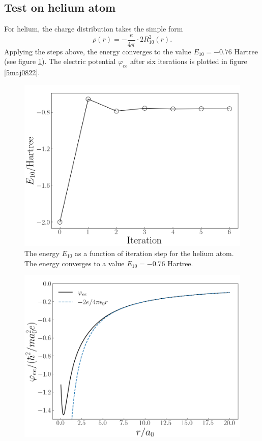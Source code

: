\documentclass[twocolumn]{article}
\begin{document}
\begin{large}
\subsection*{Test on helium atom}
For helium, the charge distribution takes the simple form
\begin{equation}
    \rho(r) = -\frac{e}{4\pi}\cdot 2R^2_{10}(r).
\end{equation}
Applying the steps above, the energy converges to the value $E_{10} = -0.76$ Hartree (see figure \ref{5maj0820}). The electric potential $\varphi_{ee}$ after six iterations is plotted in figure \ref{5maj0822}.
\begin{figure}[t]
    \includegraphics[scale=0.35]{Heliumenergy.png}
    \caption{The energy $E_{10}$ as a function of iteration step for the helium atom. The energy converges to a value $E_{10}=-0.76$ Hartree.}
    \label{5maj0820}
\end{figure}
\begin{figure}[h]
    \includegraphics[scale=0.35]{HeliumPhiee.png}

\end{figure}
\end{large}
\end{document}
